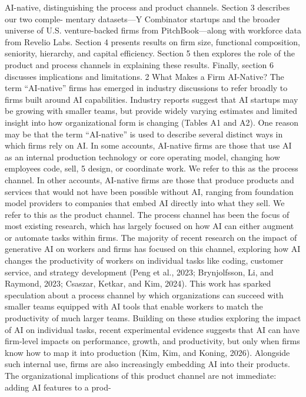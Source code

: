 AI-native, distinguishing the process and product channels. Section 3 describes our two comple-
mentary datasets—Y Combinator startups and the broader universe of U.S. venture-backed firms
from PitchBook—along with workforce data from Revelio Labs. Section 4 presents results on firm
size, functional composition, seniority, hierarchy, and capital efficiency. Section 5 then explores the
role of the product and process channels in explaining these results. Finally, section 6 discusses
implications and limitations.
2
What Makes a Firm AI-Native?
The term “AI-native” firms has emerged in industry discussions to refer broadly to firms built
around AI capabilities. Industry reports suggest that AI startups may be growing with smaller
teams, but provide widely varying estimates and limited insight into how organizational form is
changing (Tables A1 and A2). One reason may be that the term “AI-native” is used to describe
several distinct ways in which firms rely on AI. In some accounts, AI-native firms are those that use
AI as an internal production technology or core operating model, changing how employees code, sell,
5
design, or coordinate work. We refer to this as the process channel. In other accounts, AI-native
firms are those that produce products and services that would not have been possible without AI,
ranging from foundation model providers to companies that embed AI directly into what they sell.
We refer to this as the product channel.
The process channel has been the focus of most existing research, which has largely focused on
how AI can either augment or automate tasks within firms. The majority of recent research on
the impact of generative AI on workers and firms has focused on this channel, exploring how AI
changes the productivity of workers on individual tasks like coding, customer service, and strategy
development (Peng et al., 2023; Brynjolfsson, Li, and Raymond, 2023; Csaszar, Ketkar, and Kim,
2024).
This work has sparked speculation about a process channel by which organizations can
succeed with smaller teams equipped with AI tools that enable workers to match the productivity
of much larger teams. Building on these studies exploring the impact of AI on individual tasks,
recent experimental evidence suggests that AI can have firm-level impacts on performance, growth,
and productivity, but only when firms know how to map it into production (Kim, Kim, and Koning,
2026).
Alongside such internal use, firms are also increasingly embedding AI into their products. The
organizational implications of this product channel are not immediate: adding AI features to a prod-
